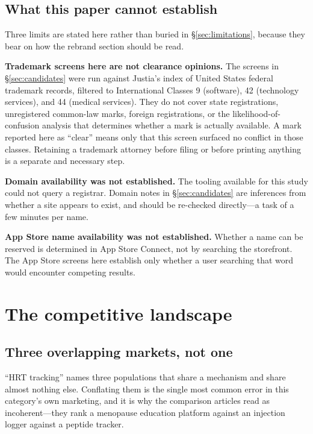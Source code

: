 \documentclass[11pt,a4paper]{article}
\begin{document}
\subsection{What this paper cannot establish}
\label{sec:cannot}

Three limits are stated here rather than buried in
\S\ref{sec:limitations}, because they bear on how the rebrand section
should be read.

\textbf{Trademark screens here are not clearance opinions.} The screens
in \S\ref{sec:candidates} were run against Justia's index of United
States federal trademark records, filtered to International Classes 9
(software), 42 (technology services), and 44 (medical services). They
do not cover state registrations, unregistered common-law marks,
foreign registrations, or the likelihood-of-confusion analysis that
determines whether a mark is actually available. A mark reported here
as ``clear'' means only that this screen surfaced no conflict in those
classes. Retaining a trademark attorney before filing or before
printing anything is a separate and necessary step.

\textbf{Domain availability was not established.} The tooling available
for this study could not query a registrar. Domain notes in
\S\ref{sec:candidates} are inferences from whether a site appears to
exist, and should be re-checked directly---a task of a few minutes per
name.

\textbf{App Store name availability was not established.} Whether a
name can be reserved is determined in App Store Connect, not by
searching the storefront. The App Store screens here establish only
whether a user searching that word would encounter competing results.

\section{The competitive landscape}
\label{sec:landscape}

\subsection{Three overlapping markets, not one}
\label{sec:threemarkets}

``HRT tracking'' names three populations that share a mechanism and
share almost nothing else. Conflating them is the single most common
error in this category's own marketing, and it is why the comparison
articles read as incoherent---they rank a menopause education platform
against an injection logger against a peptide tracker.
\end{document}
